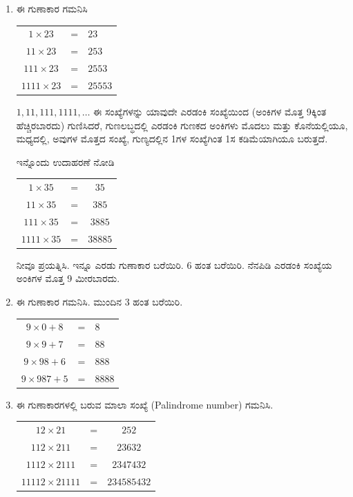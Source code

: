 \begin{enumerate}
\item ಈ ಗುಣಾಕಾರ ಗಮನಿಸಿ 

\begin{tabular}[t]{c@{\;}c@{\;}l}
$1\times 23$ & = & $23$\\
$11\times 23$ & = & $253$\\
$111\times 23$ & = & $2553$\\
$1111\times 23$ & = & $25553$
\end{tabular}

\vskip 0.2cm

$1, 11, 111, 1111, \ldots$ ಈ ಸಂಖ್ಯೆಗಳನ್ನು ಯಾವುದೇ ಎರಡಂಕಿ ಸಂಖ್ಯೆಯಿಂದ (ಅಂಕಿಗಳ ಮೊತ್ತ 9ಕ್ಕಿಂತ ಹೆಚ್ಚಿರಬಾರದು) ಗುಣಿಸಿದರೆ, ಗುಣಲಬ್ಧದಲ್ಲಿ ಎರಡಂಕಿ ಗುಣಕದ ಅಂಕಿಗಳು ಮೊದಲು ಮತ್ತು ಕೊನೆಯಲ್ಲಿಯೂ, ಮಧ್ಯದಲ್ಲಿ, ಅವುಗಳ ಮೊತ್ತದ ಸಂಖ್ಯೆ, ಗುಣ್ಯದಲ್ಲಿನ 1ಗಳ ಸಂಖ್ಯೆಗಿಂತ 1ಸ ಕಡಿಮೆಯಾಗಿಯೂ ಬರುತ್ತದೆ. 

\vskip 0.1cm

ಇನ್ನೊಂದು ಉದಾಹರಣೆ ನೋಡಿ 

\begin{tabular}[t]{c@{\;}c@{\;}c}
$1\times 35$ & = & $35$\\
$11\times 35$ & = & $385$\\
$111\times 35$ & = & $3885$\\
$1111\times 35$ & = & $38885$
\end{tabular}

\vskip 0.2cm

ನೀವೂ ಪ್ರಯತ್ನಿಸಿ. ಇನ್ನೂ ಎರಡು ಗುಣಾಕಾರ ಬರೆಯಿರಿ. 6 ಹಂತ ಬರೆಯಿರಿ. ನೆನಪಿಡಿ ಎರಡಂಕಿ ಸಂಖ್ಯೆಯ ಅಂಕಿಗಳ ಮೊತ್ತ  9 ಮೀರಬಾರದು. 

\item ಈ ಗುಣಾಕಾರ ಗಮನಿಸಿ. ಮುಂದಿನ 3 ಹಂತ ಬರೆಯಿರಿ. 

{\fontsize{11pt}{13pt}\selectfont
\begin{tabular}[t]{c@{\;}c@{\;}l}
$9\times 0 + 8$ & = & $8$\\
$9\times 9 + 7$ & = & $88$\\
$9\times 98 + 6$ & = & $888$\\
$9\times 987 + 5$ & = & $8888$\\
\end{tabular}}\relax

\item ಈ ಗುಣಾಕಾರಗಳಲ್ಲಿ ಬರುವ ಮಾಲಾ ಸಂಖ್ಯೆ (Palindrome number) ಗಮನಿಸಿ. 

{\fontsize{11pt}{13pt}\selectfont
\begin{tabular}[t]{c@{\;}c@{\;}c}
$12\times 21$ & = & $252$\\
$112\times 211$ & = & $23632$\\
$1112\times 2111$ & = & $2347432$\\
$11112\times 21111$ & = & $234585432$
\end{tabular}}\relax


\end{enumerate}
